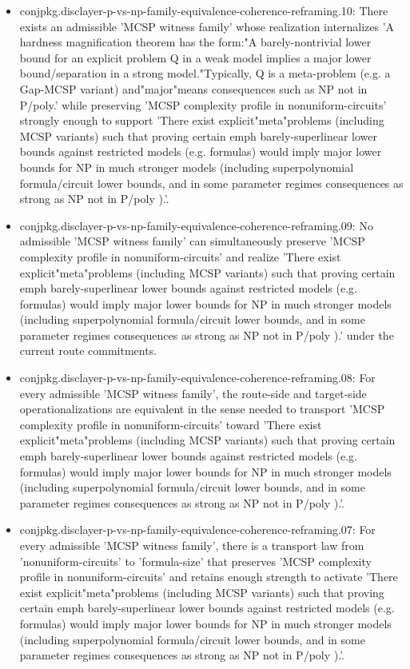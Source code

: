 \documentclass[11pt]{article}
\begin{document}
\begin{itemize}
\item conjpkg.disclayer-p-vs-np-family-equivalence-coherence-reframing.10: There exists an admissible 'MCSP witness family' whose realization internalizes 'A hardness magnification theorem has the form:"A barely-nontrivial lower bound for an explicit problem Q in a weak model implies a major lower bound/separation in a strong model."Typically, Q is a meta-problem (e.g. a Gap-MCSP variant) and"major"means consequences such as NP not in P/poly.' while preserving 'MCSP complexity profile in nonuniform-circuits' strongly enough to support 'There exist explicit"meta"problems (including MCSP variants) such that proving certain emph barely-superlinear lower bounds against restricted models (e.g. formulas) would imply major lower bounds for NP in much stronger models (including superpolynomial formula/circuit lower bounds, and in some parameter regimes consequences as strong as NP not in P/poly ).'.
\item conjpkg.disclayer-p-vs-np-family-equivalence-coherence-reframing.09: No admissible 'MCSP witness family' can simultaneously preserve 'MCSP complexity profile in nonuniform-circuits' and realize 'There exist explicit"meta"problems (including MCSP variants) such that proving certain emph barely-superlinear lower bounds against restricted models (e.g. formulas) would imply major lower bounds for NP in much stronger models (including superpolynomial formula/circuit lower bounds, and in some parameter regimes consequences as strong as NP not in P/poly ).' under the current route commitments.
\item conjpkg.disclayer-p-vs-np-family-equivalence-coherence-reframing.08: For every admissible 'MCSP witness family', the route-side and target-side operationalizations are equivalent in the sense needed to transport 'MCSP complexity profile in nonuniform-circuits' toward 'There exist explicit"meta"problems (including MCSP variants) such that proving certain emph barely-superlinear lower bounds against restricted models (e.g. formulas) would imply major lower bounds for NP in much stronger models (including superpolynomial formula/circuit lower bounds, and in some parameter regimes consequences as strong as NP not in P/poly ).'.
\item conjpkg.disclayer-p-vs-np-family-equivalence-coherence-reframing.07: For every admissible 'MCSP witness family', there is a transport law from 'nonuniform-circuits' to 'formula-size' that preserves 'MCSP complexity profile in nonuniform-circuits' and retains enough strength to activate 'There exist explicit"meta"problems (including MCSP variants) such that proving certain emph barely-superlinear lower bounds against restricted models (e.g. formulas) would imply major lower bounds for NP in much stronger models (including superpolynomial formula/circuit lower bounds, and in some parameter regimes consequences as strong as NP not in P/poly ).'.

\end{itemize}
\end{document}
